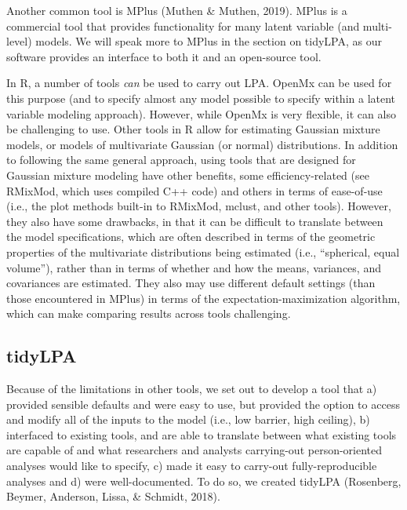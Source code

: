 \documentclass[man]{apa6}
\begin{document}
Another common tool is MPlus (Muthen \& Muthen, 2019). MPlus is a commercial tool
that provides functionality for many latent variable (and multi-level) models.
We will speak more to MPlus in the section on tidyLPA, as our software provides
an interface to both it and an open-source tool.

In R, a number of tools \emph{can} be used to carry out LPA. OpenMx can be used for
this purpose (and to specify almost any model possible to specify within a
latent variable modeling approach). However, while OpenMx is very flexible, it
can also be challenging to use. Other tools in R allow for estimating Gaussian
mixture models, or models of multivariate Gaussian (or normal) distributions. In
addition to following the same general approach, using tools that are designed
for Gaussian mixture modeling have other benefits, some efficiency-related (see
RMixMod, which uses compiled C++ code) and others in terms of ease-of-use (i.e.,
the plot methods built-in to RMixMod, mclust, and other tools). However, they
also have some drawbacks, in that it can be difficult to translate between the
model specifications, which are often described in terms of the geometric
properties of the multivariate distributions being estimated (i.e., \enquote{spherical,
equal volume}), rather than in terms of whether and how the means, variances,
and covariances are estimated. They also may use different default settings
(than those encountered in MPlus) in terms of the expectation-maximization
algorithm, which can make comparing results across tools challenging.

\hypertarget{tidylpa}{%
\subsection{tidyLPA}\label{tidylpa}}

Because of the limitations in other tools, we set out to develop a tool that a)
provided sensible defaults and were easy to use, but provided the option to
access and modify all of the inputs to the model (i.e., low barrier, high
ceiling), b) interfaced to existing tools, and are able to translate between
what existing tools are capable of and what researchers and analysts
carrying-out person-oriented analyses would like to specify, c) made it easy to
carry-out fully-reproducible analyses and d) were well-documented. To do so, we
created tidyLPA (Rosenberg, Beymer, Anderson, Lissa, \& Schmidt, 2018).
\end{document}
